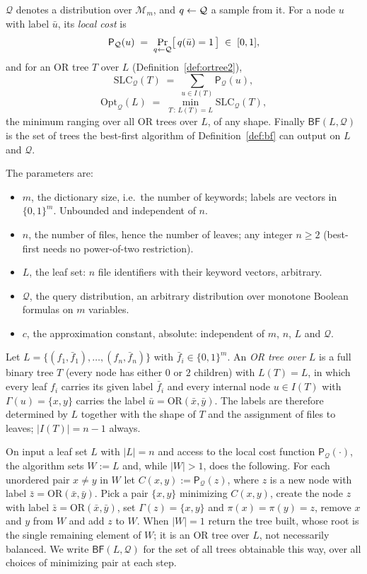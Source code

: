 \documentclass{aicr-conjecture}
\newcommand{\bits}{\{0,1\}}
\newcommand{\Qd}{\mathcal{Q}}
\newcommand{\Mon}{\mathcal{M}}
\newcommand{\ORv}{\mathrm{OR}}
\newcommand{\Pcost}{\mathsf{P}}
\newcommand{\SLC}{\mathrm{SLC}}
\newcommand{\Opt}{\mathrm{Opt}}
\newcommand{\BF}{\mathsf{BF}}
\begin{document}
$\Qd$ denotes a distribution over $\Mon_m$, and $q \sample \Qd$ a sample
from it. For a node $u$ with label $\bar u$, its \emph{local cost} is
\[
  \Pcost_{\Qd}(u) \;=\; \Pr_{q \sample \Qd}\bigl[\,q(\bar u) = 1\,\bigr]
  \;\in\; [0,1],
\]
and for an OR tree $T$ over $L$ (Definition~\ref{def:ortree2}),
\[
  \SLC_{\Qd}(T) \;=\; \sum_{u \in I(T)} \Pcost_{\Qd}(u),
\]
\[
  \Opt_{\Qd}(L) \;=\; \min_{T \,:\, L(T) = L} \SLC_{\Qd}(T),
\]
the minimum ranging over all OR trees over $L$, of any shape. Finally
$\BF(L,\Qd)$ is the set of trees the best-first algorithm of
Definition~\ref{def:bf} can output on $L$ and $\Qd$.

The parameters are:
\begin{itemize}
\item $m$, the dictionary size, i.e.\ the number of keywords; labels are
  vectors in $\bits^m$. Unbounded and independent of $n$.
\item $n$, the number of files, hence the number of leaves; any integer
  $n \ge 2$ (best-first needs no power-of-two restriction).
\item $L$, the leaf set: $n$ file identifiers with their keyword
  vectors, arbitrary.
\item $\Qd$, the query distribution, an arbitrary distribution over
  monotone Boolean formulas on $m$ variables.
\item $c$, the approximation constant, absolute: independent of $m$,
  $n$, $L$ and $\Qd$.
\end{itemize}

\begin{definition}\label{def:ortree2}
Let $L = \{(f_1,\bar f_1),\dots,(f_n,\bar f_n)\}$ with
$\bar f_i \in \bits^m$. An \emph{OR tree over $L$} is a full binary tree
$T$ (every node has either $0$ or $2$ children) with $L(T) = L$, in which
every leaf $f_i$ carries its given label $\bar f_i$ and every internal
node $u \in I(T)$ with $\Gamma(u) = \{x,y\}$ carries the label
$\bar u = \ORv(\bar x, \bar y)$. The labels are therefore determined by
$L$ together with the shape of $T$ and the assignment of files to leaves;
$|I(T)| = n - 1$ always.
\end{definition}

\begin{definition}[the best-first algorithm $\BF$]\label{def:bf}
On input a leaf set $L$ with $|L| = n$ and access to the local cost
function $\Pcost_{\Qd}(\cdot)$, the algorithm sets $W := L$ and, while
$|W| > 1$, does the following. For each unordered pair $x \neq y$ in $W$
let $C(x,y) := \Pcost_{\Qd}(z)$, where $z$ is a new node with label
$\bar z = \ORv(\bar x, \bar y)$. Pick a pair $\{x,y\}$ minimizing
$C(x,y)$, create the node $z$ with label
$\bar z = \ORv(\bar x,\bar y)$, set $\Gamma(z) = \{x,y\}$ and
$\pi(x) = \pi(y) = z$, remove $x$ and $y$ from $W$ and add $z$ to $W$.
When $|W| = 1$ return the tree built, whose root is the single remaining
element of $W$; it is an OR tree over $L$, not necessarily balanced. We
write $\BF(L,\Qd)$ for the set of all trees obtainable this way, over all
choices of minimizing pair at each step.
\end{definition}
\end{document}
